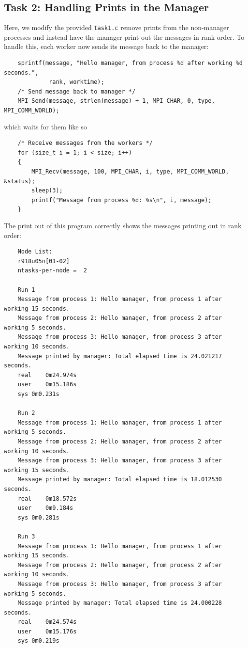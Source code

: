 \documentclass{article}
\begin{document}
\subsection{Task 2: Handling Prints in the Manager}
Here, we modify the provided \texttt{task1.c} remove prints from the non-manager 
processes and instead have the manager print out the messages in rank order. To 
handle this, each worker now sends its message back to the manager:
\begin{lstlisting}
    sprintf(message, "Hello manager, from process %d after working %d seconds.",
             rank, worktime);
    /* Send message back to manager */
    MPI_Send(message, strlen(message) + 1, MPI_CHAR, 0, type, MPI_COMM_WORLD);
\end{lstlisting}
which waits for them like so
\begin{lstlisting}
    /* Receive messages from the workers */
    for (size_t i = 1; i < size; i++)
    {
        MPI_Recv(message, 100, MPI_CHAR, i, type, MPI_COMM_WORLD, &status);
        sleep(3);
        printf("Message from process %d: %s\n", i, message);
    }
\end{lstlisting}
The print out of this program correctly shows the messages printing out in rank order:
\begin{verbatim}
    Node List:
    r918u05n[01-02]
    ntasks-per-node =  2

    Run 1
    Message from process 1: Hello manager, from process 1 after working 15 seconds.
    Message from process 2: Hello manager, from process 2 after working 5 seconds.
    Message from process 3: Hello manager, from process 3 after working 10 seconds.
    Message printed by manager: Total elapsed time is 24.021217 seconds.
    real	0m24.974s
    user	0m15.186s
    sys	0m0.231s
    
    Run 2
    Message from process 1: Hello manager, from process 1 after working 5 seconds.
    Message from process 2: Hello manager, from process 2 after working 10 seconds.
    Message from process 3: Hello manager, from process 3 after working 15 seconds.
    Message printed by manager: Total elapsed time is 18.012530 seconds.
    real	0m18.572s
    user	0m9.184s
    sys	0m0.281s
    
    Run 3
    Message from process 1: Hello manager, from process 1 after working 15 seconds.
    Message from process 2: Hello manager, from process 2 after working 10 seconds.
    Message from process 3: Hello manager, from process 3 after working 5 seconds.
    Message printed by manager: Total elapsed time is 24.000228 seconds.
    real	0m24.574s
    user	0m15.176s
    sys	0m0.219s
\end{verbatim}
\end{document}
